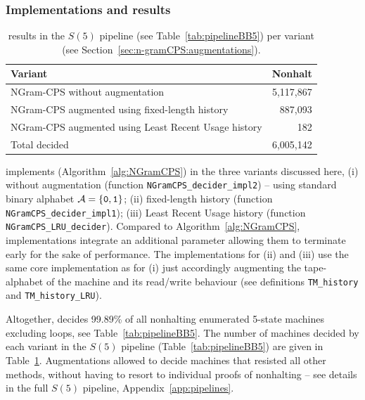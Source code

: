 \subsubsection{Implementations and results}\label{sec:n-gramCPS:results}
\begin{table}[h!]
    \centering
    \begin{tabular}{|l|r|}
        \hline
        Variant                                              & Nonhalt   \\  \hline
        NGram-CPS without augmentation                       & 5,117,867 \\
        NGram-CPS augmented using fixed-length history       & 887,093   \\
        NGram-CPS augmented using Least Recent Usage history & 182       \\ \hline
        Total decided                                        & 6,005,142 \\
        \hline
    \end{tabular}
    \caption{\ngramcps results in the $S(5)$ pipeline (see Table~\ref{tab:pipelineBB5}) per variant (see Section~\ref{sec:n-gramCPS:augmentations}).}\label{tab:ngramcps:results}
\end{table}

\CoqBB implements \ngramcps (Algorithm~\ref{alg:NGramCPS}) in the three variants discussed here, (i) without augmentation (function \texttt{NGramCPS\_decider\_impl2}) -- \ie using standard binary alphabet $\mathcal{A}=\{\texttt{0},\texttt{1}\}$; (ii) fixed-length history (function \texttt{NGramCPS\_decider\_impl1}); (iii) Least Recent Usage history (function \texttt{NGramCPS\_LRU\_decider}). Compared to Algorithm~\ref{alg:NGramCPS}, \CoqBB implementations integrate an additional parameter allowing them to terminate early for the sake of performance. The implementations for (ii) and (iii) use the same core implementation as for (i) just accordingly augmenting the tape-alphabet of the machine and its read/write behaviour (see definitions \texttt{TM\_history} and \texttt{TM\_history\_LRU}).

Altogether, \ngramcps decides 99.89\% of all nonhalting enumerated 5-state machines excluding loops, see Table~\ref{tab:pipelineBB5}. The number of machines decided by each \ngramcps variant in the $S(5)$ pipeline (Table~\ref{tab:pipelineBB5}) are given in Table~\ref{tab:ngramcps:results}. Augmentations allowed to decide machines that resisted all other methods, without having to resort to individual proofs of nonhalting -- see details in the full $S(5)$ pipeline, Appendix~\ref{app:pipelines}.

